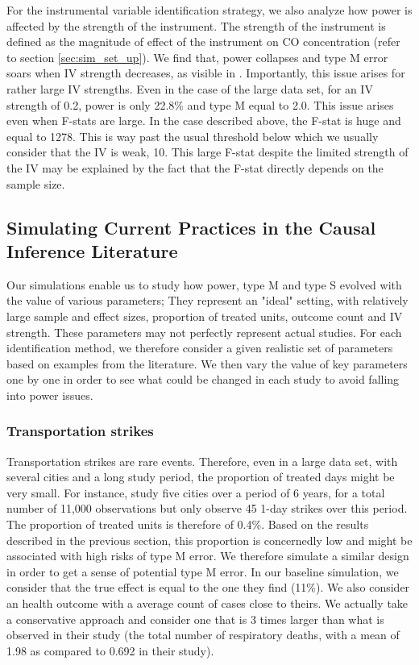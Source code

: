 \documentclass[12pt]{article}
\begin{document}
            For the instrumental variable identification strategy, we also analyze how power is affected by the strength of the instrument. The strength of the instrument is defined as the magnitude of effect of the instrument on CO concentration (refer to section \ref{sec:sim_set_up}). We find that, power collapses and type M error soars when IV strength decreases, as visible in . Importantly, this issue arises for rather large IV strengths. Even in the case of the large data set, for an IV strength of 0.2, power is only 22.8\% and type M equal to 2.0. This issue arises even when F-stats are large. In the case described above, the F-stat is huge and equal to 1278. This is way past the usual threshold below which we usually consider that the IV is weak, 10. This large F-stat despite the limited strength of the IV may be explained by the fact that the F-stat directly depends on the sample size. 

    \subsection{Simulating Current Practices in the Causal Inference Literature}

        Our simulations enable us to study how power, type M and type S evolved with the value of various parameters; They represent an "ideal" setting, with relatively large sample and effect sizes, proportion of treated units, outcome count and IV strength. These parameters may not perfectly represent actual studies. For each identification method, we therefore consider a given realistic set of parameters based on examples from the literature. We then vary the value of key parameters one by one in order to see what could be changed in each study to avoid falling into power issues.
        
        \subsubsection{Transportation strikes}
        
            Transportation strikes are rare events. Therefore, even in a large data set, with several cities and a long study period, the proportion of treated days might be very small. For instance, \cite{bauernschuster_when_2017} study five cities over a period of 6 years, for a total number of 11,000 observations but only observe 45 1-day strikes over this period. The proportion of treated units is therefore of 0.4\%. Based on the results described in the previous section, this proportion is concernedly low and might be associated with high risks of type M error. We therefore simulate a similar design in order to get a sense of potential type M error. In our baseline simulation, we consider that the true effect is equal to the one they find (11\%). We also consider an health outcome with a average count of cases close to theirs. We actually take a conservative approach and consider one that is 3 times larger than what is observed in their study (the total number of respiratory deaths, with a mean of 1.98 as compared to 0.692 in their study).
            
\end{document}

